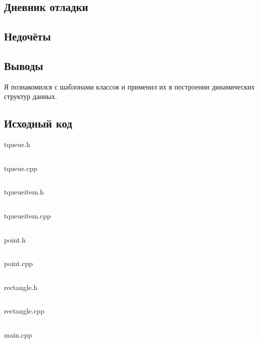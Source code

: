 \documentclass[12pt]{article}
\begin{document}
\subsection*{Дневник отладки}


\subsection*{Недочёты}


\subsection*{Выводы}

Я познакомился с шаблонами классов и применил их в построении динамических структур данных.


\vfill

\subsection*{Исходный код}

{\Huge tqueue.h}
\inputminted{C++}{tqueue.h}
    \pagebreak

{\Huge tqueue.cpp}
\inputminted{C++}{tqueue.inl}
\pagebreak

{\Huge tqueueitem.h}
\inputminted{C++}{tqueueitem.h}
\pagebreak

{\Huge tqueueitem.cpp}
\inputminted{C++}{tqueueitem.inl}
\pagebreak
    
{\Huge point.h}
\inputminted{C++}{point.h}
    \pagebreak

{\Huge point.cpp}
\inputminted{C++}{point.cpp}
    \pagebreak

{\Huge rectangle.h}
\inputminted{C++}{rectangle.h}
\pagebreak

{\Huge rectangle.cpp}
\inputminted{C++}{rectangle.cpp}
\pagebreak
    
{\Huge main.cpp}
\inputminted{C++}{main.cpp}
    \pagebreak
    
\end{document}
